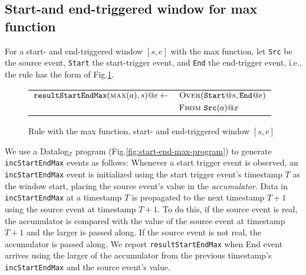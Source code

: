 \subsection{Start-and end-triggered window for {\sc max} function}

For a start- and end-triggered window $[s,e]$
with the {\sc max} function,
let \texttt{Src} be the source event,
\texttt{Start} the start-trigger event,
and \texttt{End} the end-trigger event,
i.e., the rule has the form of Fig.\:\ref{fig:start-end-max-rule}.

\begin{figure}[h!]
\begin{tabular}{ll}
$\mbox{\tt resultStartEndMax}(\mbox{\sc max}(a),s)@e \leftarrow$ & $\textsc{Over}(\texttt{Start}@s,\texttt{End}@e)$\\
                           & $\textsc{From}\ \mbox{\tt Src}(a)@x$\\
\end{tabular}
\caption{Rule with the {\sc max} function, start- and end-triggered window $[s,e]$}
\label{fig:start-end-max-rule}
\end{figure}

We use a Datalog$_{\mathbb{Z}}$ program (Fig.\:\ref{fig:start-end-max-program})
to generate \texttt{incStartEndMax} events as follows:
Whenever a start trigger event is observed,
an \texttt{incStartEndMax} event is initialized
using the start trigger event's timestamp $T$ as the window start,
placing the source event's value in the {\em accumulator}.
Data in \texttt{incStartEndMax} at a timestamp $T$ is propagated
to the next timestamp $T{+}1$ using the source event at timestamp $T{+}1$.
To do this, if the source event is real,
the accumulator is compared with the value of the source event
at timestamp $T{+}1$ and the larger is passed along.
If the source event is not real,
the accumulator is passed along.
We report \texttt{resultStartEndMax} when {\sc End} event arrives using
the larger of the accumulator from the previous timestamp's \texttt{incStartEndMax}
and the source event's value.

